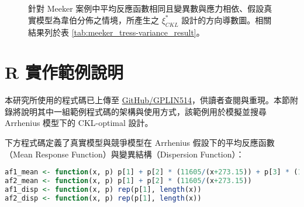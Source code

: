 
\begin{figure}[H]
\centering
{}
 \\
 \\
\caption{針對 Meeker 案例中平均反應函數相同且變異數與應力相依、假設真實模型為韋伯分佈之情境，所產生之 $\xi^*_{CKL}$ 設計的方向導數圖。相關結果列於表 \ref{tab:meeker_tress-variance_result}。}
\label{fig:meeker_tress-variance_result_wb}
\end{figure}

\chapter{R 實作範例說明}\label{appendixB}

\hspace*{8mm} 本研究所使用的程式碼已上傳至 \href{https://github.com/GPLIN514/Master-Thesis-ALT-Model-Discrimination-Design/blob/main/Thesis-code/code/Appendix%20B%20example%20code.R}{GitHub/GPLIN514}，供讀者查閱與重現。本節附錄將說明其中一組範例程式碼的架構與使用方式，該範例用於模擬並搜尋 Arrhenius 模型下的 CKL-optimal 設計。

\hspace*{8mm} 下方程式碼定義了真實模型與競爭模型在 Arrhenius 假設下的平均反應函數（Mean Response Function）與變異結構（Dispersion Function）：

\begin{lstlisting}[language=R, caption={模型結構設定}]
af1_mean <- function(x, p) p[1] + p[2] * (11605/(x+273.15)) + p[3] * (11605/(x+273.15))^2
af2_mean <- function(x, p) p[1] + p[2] * (11605/(x+273.15))
af1_disp <- function(x, p) rep(p[1], length(x))
af2_disp <- function(x, p) rep(p[1], length(x))
\end{lstlisting}

